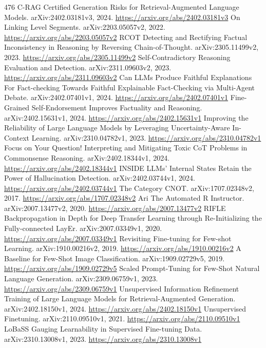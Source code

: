 \documentclass[11pt]{article}
\begin{document}
\begin{thebibliography}{476}
 C-RAG Certified Generation Risks for Retrieval-Augmented Language Models. arXiv:2402.03181v3, 2024. \url{https://arxiv.org/abs/2402.03181v3}
 On Linking Level Segments. arXiv:2203.05057v2, 2022. \url{https://arxiv.org/abs/2203.05057v2}
 RCOT Detecting and Rectifying Factual Inconsistency in Reasoning by Reversing Chain-of-Thought. arXiv:2305.11499v2, 2023. \url{https://arxiv.org/abs/2305.11499v2}
 Self-Contradictory Reasoning Evaluation and Detection. arXiv:2311.09603v2, 2023. \url{https://arxiv.org/abs/2311.09603v2}
 Can LLMs Produce Faithful Explanations For Fact-checking Towards Faithful Explainable Fact-Checking via Multi-Agent Debate. arXiv:2402.07401v1, 2024. \url{https://arxiv.org/abs/2402.07401v1}
 Fine-Grained Self-Endorsement Improves Factuality and Reasoning. arXiv:2402.15631v1, 2024. \url{https://arxiv.org/abs/2402.15631v1}
 Improving the Reliability of Large Language Models by Leveraging Uncertainty-Aware In-Context Learning. arXiv:2310.04782v1, 2023. \url{https://arxiv.org/abs/2310.04782v1}
 Focus on Your Question! Interpreting and Mitigating Toxic CoT Problems in Commonsense Reasoning. arXiv:2402.18344v1, 2024. \url{https://arxiv.org/abs/2402.18344v1}
 INSIDE LLMs' Internal States Retain the Power of Hallucination Detection. arXiv:2402.03744v1, 2024. \url{https://arxiv.org/abs/2402.03744v1}
 The Category CNOT. arXiv:1707.02348v2, 2017. \url{https://arxiv.org/abs/1707.02348v2}
 Ari The Automated R Instructor. arXiv:2007.13477v2, 2020. \url{https://arxiv.org/abs/2007.13477v2}
 RIFLE Backpropagation in Depth for Deep Transfer Learning through Re-Initializing the Fully-connected LayEr. arXiv:2007.03349v1, 2020. \url{https://arxiv.org/abs/2007.03349v1}
 Revisiting Fine-tuning for Few-shot Learning. arXiv:1910.00216v2, 2019. \url{https://arxiv.org/abs/1910.00216v2}
 A Baseline for Few-Shot Image Classification. arXiv:1909.02729v5, 2019. \url{https://arxiv.org/abs/1909.02729v5}
 Scaled Prompt-Tuning for Few-Shot Natural Language Generation. arXiv:2309.06759v1, 2023. \url{https://arxiv.org/abs/2309.06759v1}
 Unsupervised Information Refinement Training of Large Language Models for Retrieval-Augmented Generation. arXiv:2402.18150v1, 2024. \url{https://arxiv.org/abs/2402.18150v1}
 Unsupervised Finetuning. arXiv:2110.09510v1, 2021. \url{https://arxiv.org/abs/2110.09510v1}
 LoBaSS Gauging Learnability in Supervised Fine-tuning Data. arXiv:2310.13008v1, 2023. \url{https://arxiv.org/abs/2310.13008v1}

\end{thebibliography}
\end{document}
